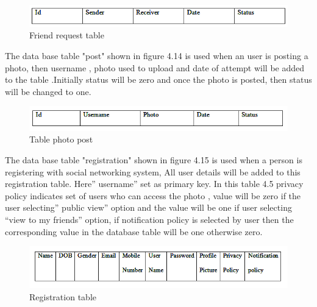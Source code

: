 \begin{figure}[H]
\begin{minipage}{1\linewidth}
\centering
 \includegraphics[width=\textwidth]{tb3.png}
            \caption[Friend Request Table]{Friend request table}
             \label{frt}
\end{minipage}
\end{figure}
\justifying
The data base table "post" shown in figure 4.14 is used when an user  is posting  a photo, then username , photo used to upload and date of attempt will be added to the table .Initially status will be zero and once the photo is posted, then status will be changed to one.
\begin{figure}[H]
\begin{minipage}{1\linewidth}
\centering
 \includegraphics[width=\textwidth]{tbl5.png}
            \caption[Table Photo Post]{ Table photo post}
             \label{pt}
\end{minipage}
\end{figure}
\justifying
The data base table "registration" shown in figure 4.15 is used when a person is registering with social networking system,  All user details will be added to this registration table. Here” username” set as primary key. In this table 4.5 privacy policy indicates set of users  who can access the photo , value will be zero if the user selecting” public view” option and the value  will be one if user selecting  “view to my friends” option, if notification policy is selected by user then the corresponding value in the database table will be one otherwise zero.
\begin{figure}[H]
\begin{minipage}{1\linewidth}
\centering
 \includegraphics[width=\textwidth]{tbl7.png}
            \caption[Registration Table]{Registration table}
             \label{rt}
\end{minipage}
\end{figure}
